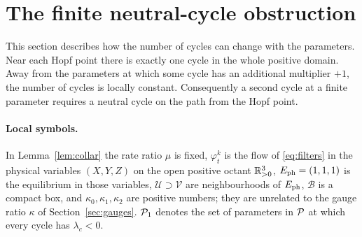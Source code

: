 \section{The finite neutral-cycle obstruction}\label{sec:obstruction}
This section describes how the number of cycles can change with the parameters. Near each Hopf point there is exactly one cycle in the whole positive domain. Away from the parameters at which some cycle has an additional multiplier $+1$, the number of cycles is locally constant. Consequently a second cycle at a finite parameter requires a neutral cycle on the path from the Hopf point.

\paragraph{Local symbols.} In Lemma~\ref{lem:collar} the rate ratio $\mu$ is fixed, $\varphi^k_t$ is the flow of \eqref{eq:filters} in the physical variables $(X,Y,Z)$ on the open positive octant $\mathbb R^3_{>0}$, $E_{\rm ph}=(1,1,1)$ is the equilibrium in those variables, $\mathcal U\supset\mathcal V$ are neighbourhoods of $E_{\rm ph}$, $\mathcal B$ is a compact box, and $\kappa_0,\kappa_1,\kappa_2$ are positive numbers; they are unrelated to the gauge ratio $\kappa$ of Section~\ref{sec:gauges}. $\mathcal P_1$ denotes the set of parameters in $\mathcal P$ at which every cycle has $\lambda_c<0$.

